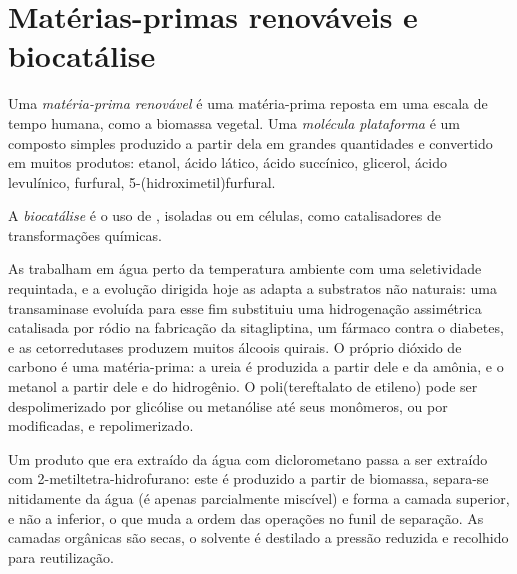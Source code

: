 \section{Matérias-primas renováveis e biocatálise}

\begin{definition}\label{def:b3:green-industrial:feedstock}
Uma \emph{matéria-prima renovável} é uma matéria-prima
reposta em uma escala de tempo humana, como a biomassa vegetal. Uma \emph{molécula
plataforma} é um composto simples produzido a partir dela em grandes
quantidades e convertido em muitos produtos: etanol, ácido lático, ácido succínico,
glicerol, ácido levulínico, furfural, 5-(hidroximetil)furfural.
\end{definition}

\begin{definition}[Biocatálise]\label{def:b3:green-industrial:biocatalysis}
A \emph{biocatálise} é o uso de , isoladas ou em
células, como catalisadores de transformações químicas.
\end{definition}

As  trabalham em água perto da temperatura ambiente com uma seletividade requintada, e a
evolução dirigida hoje as adapta a substratos não naturais: uma transaminase
evoluída para esse fim substituiu uma hidrogenação assimétrica catalisada por ródio
na fabricação da sitagliptina, um fármaco contra o diabetes, e as cetorredutases produzem muitos
álcoois quirais. O próprio dióxido de carbono é uma matéria-prima: a ureia é produzida a partir dele e da
amônia, e o metanol a partir dele e do hidrogênio. O poli(tereftalato de etileno) pode ser
despolimerizado por glicólise ou metanólise até seus monômeros, ou por
 modificadas, e repolimerizado.

\begin{inthelab}
Um produto que era extraído da água com diclorometano passa a ser extraído
com 2-metiltetra-hidrofurano: este é produzido a partir de biomassa, separa-se
nitidamente da água (é apenas parcialmente miscível) e forma a camada superior, e não
a inferior, o que muda a ordem das operações no funil de separação. As
camadas orgânicas são secas, o solvente é destilado a pressão reduzida e
recolhido para reutilização.
\end{inthelab}

